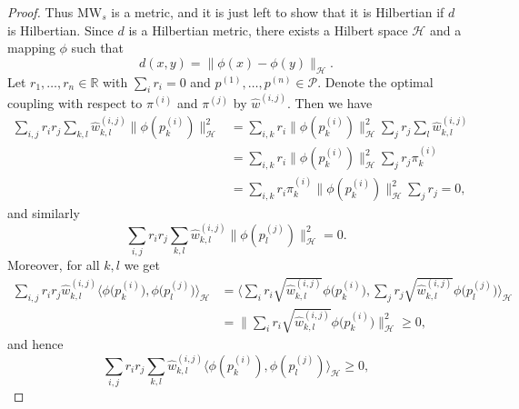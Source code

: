 \documentclass{article}
\begin{document}
\begin{proof}
    Thus $\mathrm{MW}_s$ is a metric, and it is just left to show that it is Hilbertian
    if $d$ is Hilbertian.
    Since $d$ is a Hilbertian metric, there exists a Hilbert
    space $\mathcal{H}$ and a mapping $\phi$ such that
    \begin{equation*}
        d(x, y) = \|\phi(x) - \phi(y)\|_{\mathcal{H}}.
    \end{equation*}
    Let $r_1, \ldots, r_n \in \mathbb{R}$ with $\sum_i r_i = 0$
    and $p^{(1)}, \ldots, p^{(n)} \in \mathcal{P}$. Denote
    the optimal coupling with respect to $\pi^{(i)}$ and
    $\pi^{(j)}$ by $\hat{w}^{(i,j)}$. Then we have
    \begin{equation}\label{eq:hilbert_zero_1}
        \begin{split}
            \sum_{i,j} r_i r_j \sum_{k,l} \hat{w}^{(i,j)}_{k,l} \|\phi(p^{(i)}_k)\|_\mathcal{H}^2
            &= \sum_{i,k} r_i \|\phi(p^{(i)}_k)\|_\mathcal{H}^2 \sum_j r_j \sum_l \hat{w}^{(i,j)}_{k,l} \\
            &= \sum_{i,k} r_i \|\phi(p^{(i)}_k)\|_\mathcal{H}^2 \sum_j r_j \pi^{(i)}_k \\
            &= \sum_{i,k} r_i \pi^{(i)}_k \|\phi(p^{(i)}_k)\|_\mathcal{H}^2 \sum_j r_j
            = 0,
        \end{split}
    \end{equation}
    and similarly
    \begin{equation}\label{eq:hilbert_zero_2}
        \sum_{i,j} r_i r_j \sum_{k,l} \hat{w}^{(i,j)}_{k,l} \|\phi(p^{(j)}_l)\|_\mathcal{H}^2 = 0.
    \end{equation}
    Moreover, for all $k,l$ we get
    \begin{equation*}
        \begin{split}
            \sum_{i,j} r_i r_j \hat{w}^{(i,j)}_{k,l} \Big\langle \phi\Big(p^{(i)}_k\Big), \phi\Big(p^{(j)}_l\Big) \Big\rangle_\mathcal{H}
            &= \Big\langle \sum_i r_i \sqrt{\hat{w}^{(i,j)}_{k,l}} \phi\Big(p^{(i)}_k\Big), \sum_j r_j \sqrt{\hat{w}^{(i,j)}_{k,l}}  \phi\Big(p^{(j)}_l\Big)\Big\rangle_\mathcal{H} \\
            &= \Big\| \sum_i r_i \sqrt{\hat{w}^{(i,j)}_{k,l}} \phi\Big(p^{(i)}_k\Big) \Big\|_{\mathcal{H}}^2 \geq 0,
        \end{split}
    \end{equation*}
    and hence
    \begin{equation}\label{eq:hilbert_nonneg_1}
        \sum_{i,j} r_i r_j \sum_{k,l} \hat{w}^{(i,j)}_{k,l} \Big\langle \phi(p^{(i)}_k), \phi(p^{(j)}_l) \Big\rangle_\mathcal{H} \geq 0,

\end{equation}
\end{proof}
\end{document}

